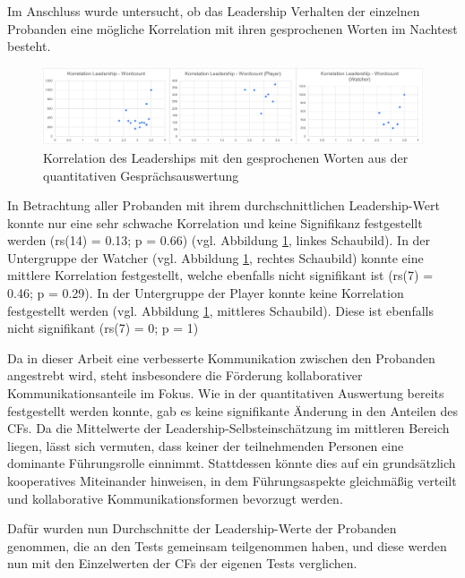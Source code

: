 Im Anschluss wurde untersucht, ob das Leadership Verhalten der einzelnen Probanden eine mögliche Korrelation mit ihren gesprochenen Worten im Nachtest besteht. 

\begin{figure}[ht]
\centering
\includegraphics[width=1\linewidth]{content/pictures/Korrelation_Leadership_Wordcount_full.png}
\caption{Korrelation des Leaderships mit den gesprochenen Worten aus der quantitativen Gesprächsauswertung}
\label{fig:correlation_leadership_wordcount}
\end{figure}

In Betrachtung aller Probanden mit ihrem durchschnittlichen Leadership-Wert konnte nur eine sehr schwache Korrelation und keine Signifikanz festgestellt werden (rs(14) = 0.13; p = 0.66) (vgl. Abbildung \ref{fig:correlation_leadership_wordcount}, linkes Schaubild). In der Untergruppe der Watcher (vgl. Abbildung \ref{fig:correlation_leadership_wordcount}, rechtes Schaubild) konnte eine mittlere Korrelation festgestellt, welche ebenfalls nicht signifikant ist (rs(7) = 0.46; p = 0.29). In der Untergruppe der Player konnte keine Korrelation festgestellt werden (vgl. Abbildung \ref{fig:correlation_leadership_wordcount}, mittleres Schaubild). Diese ist ebenfalls nicht signifikant (rs(7) = 0; p = 1)

Da in dieser Arbeit eine verbesserte Kommunikation zwischen den Probanden angestrebt wird, steht insbesondere die Förderung kollaborativer Kommunikationsanteile im Fokus. Wie in der quantitativen Auswertung bereits festgestellt werden konnte, gab es keine signifikante Änderung in den Anteilen des \ac{CF}s. Da die Mittelwerte der Leadership-Selbsteinschätzung im mittleren Bereich liegen, lässt sich vermuten, dass keiner der teilnehmenden Personen eine dominante Führungsrolle einnimmt. Stattdessen könnte dies auf ein grundsätzlich kooperatives Miteinander hinweisen, in dem Führungsaspekte gleichmäßig verteilt und kollaborative Kommunikationsformen bevorzugt werden.

Dafür wurden nun Durchschnitte der Leadership-Werte der Probanden genommen, die an den Tests gemeinsam teilgenommen haben, und diese werden nun mit den Einzelwerten der \ac{CF}s der eigenen Tests verglichen.

